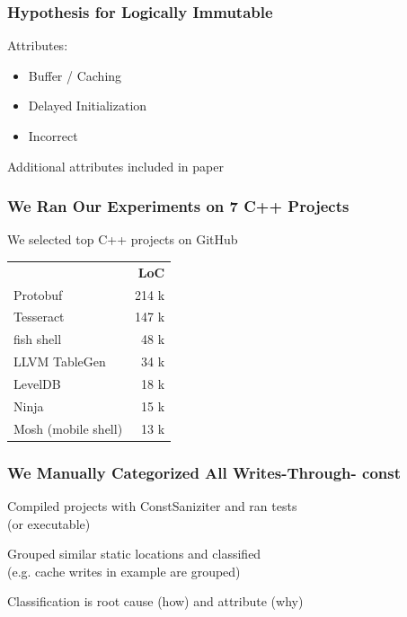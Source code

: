 \documentclass[aspectratio=43]{beamer}
\newcommand{\const}{{\color{blue} \bfseries \ttfamily const}}
\begin{document}
  \begin{frame}
    \frametitle{Hypothesis for Logically Immutable}
    \large
    Attributes:
    \begin{itemize}
      \setlength\itemsep{0.5em}
      \item Buffer / Caching
      \item Delayed Initialization
      \item Incorrect
    \end{itemize}

    \vspace{2em}
    Additional attributes included in paper
  \end{frame}

  \begin{frame}
    \frametitle{We Ran Our Experiments on 7 C++ Projects}
    \large
    We selected top C++ projects on GitHub

    \centering
    \vspace{1.5em}
    \begin{tabular}{l r}
      & \textbf{LoC} \\

      Protobuf & 214 k\\
      Tesseract & 147 k \\
      fish shell & 48 k \\
      LLVM TableGen & 34 k \\
      LevelDB & 18 k \\
      Ninja & 15 k \\
      Mosh (mobile shell) & 13 k \\
    \end{tabular}
  \end{frame}

  \begin{frame}
    \frametitle{We Manually Categorized All Writes-Through-\const{}}
    \large
    Compiled projects with ConstSaniziter and ran tests\\(or executable)

    \vspace{2em}
    Grouped similar static locations and classified
    \\(e.g. cache writes in example are grouped)

    \vspace{2em}
    Classification is root cause (how) and attribute (why)
  \end{frame}
\end{document}
